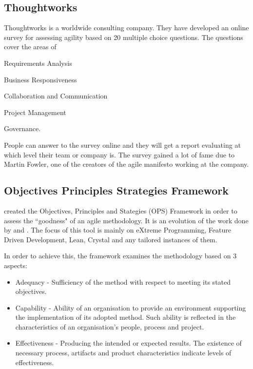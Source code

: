 \subsection{Thoughtworks} %
Thoughtworks \cite{thoughtworks} is a worldwide consulting company. They have developed an online survey for assessing agility based on 20 multiple choice questions. The questions cover the areas of 
\begin{inparaenum} [a\upshape)]
	\item Requirements Analysis
	\item Business Responsiveness
	\item Collaboration and Communication
	\item Project Management
	\item Governance.
\end{inparaenum}
People can answer to the survey online and they will get a report evaluating at which level their team or company is. The survey gained a lot of fame due to Martin Fowler, one of the creators of the agile manifesto working at the company.

\subsection{Objectives Principles Strategies Framework}
\label{subsec:ops}
\citet{sventha_dissertation} created the Objectives, Principles and Stategies (\ac{OPS}) Framework in order to assess the ``goodness" of an agile methodology. It is an evolution of the work done by \citet{2604} and \citet{sidky_dissertation}. The focus of this tool is mainly on eXtreme Programming, Feature Driven Development, Lean, Crystal and any tailored instances of them.

In order to achieve this, the framework examines the methodology based on 3 aspects:
\begin{itemize}
\item Adequacy - Sufficiency of the method with respect to meeting its stated objectives.
\item Capability - Ability of an organisation to provide an environment supporting the implementation of its adopted method. Such ability is reflected in the characteristics of an organisation's people, process
and project.
\item Effectiveness - Producing the intended or expected results. The existence of necessary process, artifacts and product characteristics indicate levels of effectiveness.
\end{itemize}

